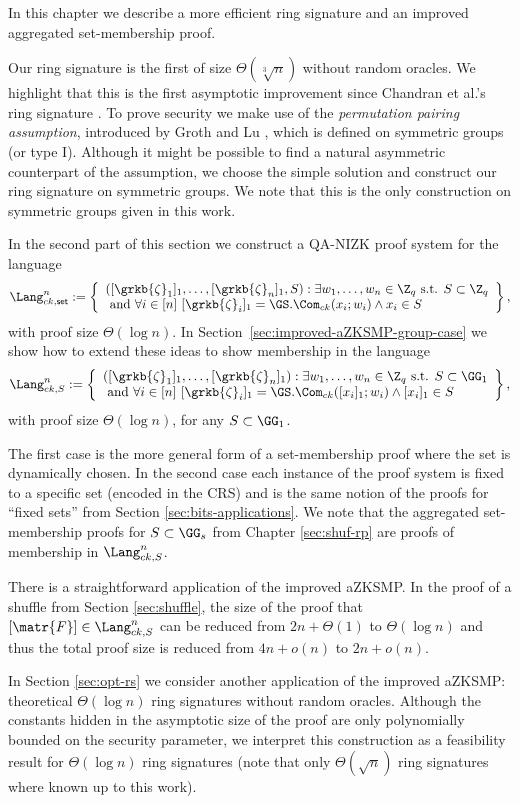 In this chapter we describe a more efficient ring signature and an improved aggregated set-membership proof.

Our ring signature is the first of size $\Theta(\sqrt[3]{n})$ without random oracles. We highlight that this is the first asymptotic improvement since Chandran et al.'s ring signature \cite{ICALP:ChaGroSah07}. To prove security we make use of the \emph{permutation pairing assumption}, introduced by Groth and Lu \cite{AC:GroLu07}, which is defined on symmetric groups (or type I). Although it might be possible to find a natural asymmetric counterpart of the assumption, we choose the simple solution and construct our ring signature on symmetric groups. We note that this is the only construction on symmetric groups given in this work.

In the second part of this section we construct a QA-NIZK proof system for the language
\[
\Lang_{ck,\mathsf{set}}^n:=\left\{\begin{array}{l}
([\grkb{\zeta}_1]_1,\ldots,[\grkb{\zeta}_n]_1,S):\exists w_1,\ldots,w_n\in\Z_q \text{ s.t. } S\subset\Z_q\\
\text{ and } \forall i\in [n]\ [\grkb{\zeta}_i]_1=\GS.\Com_{ck}(x_i;w_i)\wedge x_i\in S
\end{array}\right\},
\]
with proof size $\Theta(\log n)$. In Section~\ref{sec:improved-aZKSMP-group-case} we show how to extend these ideas to show membership in the language
\[
\Lang_{ck,S}^n:=\left\{\begin{array}{l}
([\grkb{\zeta}_1]_1,\ldots,[\grkb{\zeta}_n]_1):\exists w_1,\ldots,w_n\in\Z_q \text{ s.t. } S\subset\GG_1 \\
\text{ and } \forall i\in [n]\ [\grkb{\zeta}_i]_1=\GS.\Com_{ck}([x_i]_1;w_i)\wedge [x_i]_1\in S
\end{array}\right\},
\]
with proof size $\Theta(\log n)$, for any \(S\subset\GG_1\).

The first case is the more general form of a set-membership proof where the set is dynamically chosen. In the second case each instance of the proof system is fixed to a specific set (encoded in the CRS) and is the same notion of the proofs for ``fixed sets'' from Section \ref{sec:bits-applications}. We note that the aggregated set-membership proofs for $S\subset\GG_s$ from Chapter \ref{sec:shuf-rp} are proofs of membership in $\Lang_{ck,S}^n$.

There is a straightforward application of the improved aZKSMP. In the proof of a shuffle from Section \ref{sec:shuffle}, the size of the proof that $[\matr{F}]\in\Lang_{ck,S}^n$ can be reduced from $2n+\Theta(1)$ to $\Theta(\log n)$ and thus the total proof size is reduced from $4n+o(n)$ to $2n+o(n)$.

In Section \ref{sec:opt-rs} we consider another application of the improved aZKSMP: theoretical $\Theta(\log n)$ ring signatures without random oracles. Although the constants hidden in the asymptotic size of the proof are only polynomially bounded on the security parameter, we interpret this construction as a feasibility result for $\Theta(\log n)$ ring signatures (note that only $\Theta(\sqrt{n})$ ring signatures where known up to this work).



